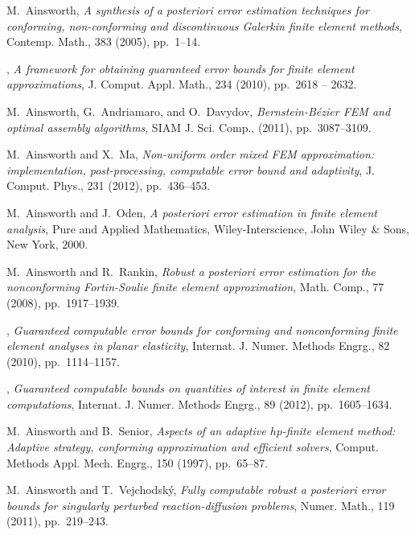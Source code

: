 \documentclass[11pt]{article}
\begin{document}
\renewcommand{\refname}{\small\bf Selected Recent Publications}
%
%
\begin{thebibliography}{10}

{\sc M.~Ainsworth}, {\em A synthesis of a posteriori error estimation
  techniques for conforming, non-conforming and discontinuous {G}alerkin finite
  element methods}, Contemp. Math., 383 (2005), pp.~1--14.

\leavevmode\vrule height 2pt depth -1.6pt width 23pt, {\em A framework for
  obtaining guaranteed error bounds for finite element approximations}, J.
  Comput. Appl. Math., 234 (2010), pp.~2618 -- 2632.

{\sc M.~Ainsworth, G.~Andriamaro, and O.~Davydov}, {\em Bernstein-{B}\'ezier
  {FEM} and optimal assembly algorithms}, SIAM J. Sci. Comp.,  (2011),
  pp.~3087--3109.

{\sc M.~Ainsworth and X.~Ma}, {\em Non-uniform order mixed {FEM} approximation:
  implementation, post-processing, computable error bound and adaptivity}, J.
  Comput. Phys., 231 (2012), pp.~436--453.

{\sc M.~Ainsworth and J.~Oden}, {\em A posteriori error estimation in finite
  element analysis}, Pure and Applied Mathematics, Wiley-Interscience, John
  Wiley \& Sons, New York, 2000.

{\sc M.~Ainsworth and R.~Rankin}, {\em Robust a posteriori error estimation for
  the nonconforming {F}ortin-{S}oulie finite element approximation}, Math.
  Comp., 77 (2008), pp.~1917--1939.

\leavevmode\vrule height 2pt depth -1.6pt width 23pt, {\em Guaranteed
  computable error bounds for conforming and nonconforming finite element
  analyses in planar elasticity}, Internat. J. Numer. Methods Engrg., 82
  (2010), pp.~1114--1157.

\leavevmode\vrule height 2pt depth -1.6pt width 23pt, {\em Guaranteed
  computable bounds on quantities of interest in finite element computations},
  Internat. J. Numer. Methods Engrg., 89 (2012), pp.~1605--1634.

{\sc M.~Ainsworth and B.~Senior}, {\em Aspects of an adaptive $hp$-finite
  element method: Adaptive strategy, conforming approximation and efficient
  solvers}, Comput. Methods Appl. Mech. Engrg., 150 (1997), pp.~65--87.

{\sc M.~Ainsworth and T.~Vejchodsk{\'y}}, {\em Fully computable robust a
  posteriori error bounds for singularly perturbed reaction-diffusion
  problems}, Numer. Math., 119 (2011), pp.~219--243.

\end{thebibliography}
\end{document}
